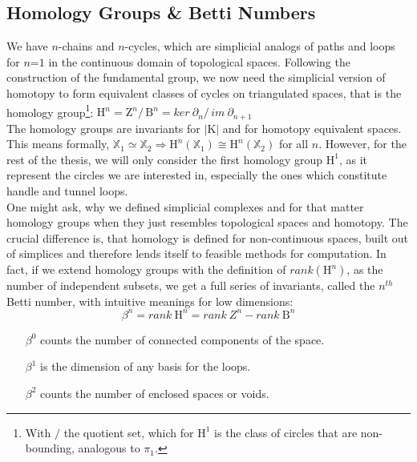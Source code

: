 \subsection{Homology Groups \& Betti Numbers}
\label{math_homology}

We have $n$-chains and $n$-cycles, which are simplicial analogs of paths and loops for $n\text{=1}$ in the continuous domain of topological spaces.
Following the construction of the fundamental group, we now need the simplicial version of homotopy to form equivalent classes of cycles on triangulated spaces, that is the homology group\footnote{  With $/$ the quotient set, which for $\mathrm{H}^{1}$ is the class of circles that are non-bounding, analogous to $\pi_{1}$.}: $\mathrm{H}^{n} = \mathrm{Z}^{n} / \,\mathrm{B}^{n} = ker ~\partial_{n} / \,im ~\partial_{n+1}$\\
The homology groups are invariants for $|\mathrm{K}|$ and for homotopy equivalent spaces.
This means formally, $\mathbb{X}_{1} \simeq \mathbb{X}_{2} \Rightarrow \mathrm{H}^{n}(\mathbb{X}_{1}) \cong \mathrm{H}^{n}(\mathbb{X}_{2})$ for all $n$.
However, for the rest of the thesis, we will only consider the first homology group $\mathrm{H}^{1}$, as it represent the circles we are interested in, especially the ones which constitute handle and tunnel loops.\\
One might ask, why we defined simplicial complexes and for that matter homology groups when they just resembles topological spaces and homotopy.
The crucial difference is, that homology is defined for non-continuous spaces, built out of simplices and therefore lends itself to feasible methods for computation.
In fact, if we extend homology groups with the definition of $rank(\mathrm{H}^{n})$, as the number of independent subsets, we get a full series of invariants, called the $n^{th}$ Betti number, with intuitive meanings for low dimensions:
\begin{equation} \label{eq:homology_betti}
	\beta^{n} = rank ~\mathrm{H}^{n} = rank ~{Z}^{n} - rank ~\mathrm{B}^{n}
\end{equation}
\vspace*{-6ex}
\begin{enumerate}
\setlength{\itemsep}{0pt}
\setlength{\parskip}{0pt}
\item[$\beta^{0}$] counts the number of connected components of the space.
\item[$\beta^{1}$] is the dimension of any basis for the loops.
\item[$\beta^{2}$] counts the number of enclosed spaces or voids.
\end{enumerate}

